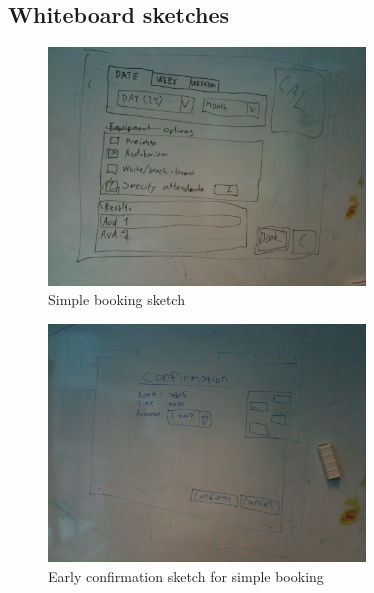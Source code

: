 \pagebreak

\subsection{Whiteboard sketches}

\begin{figure}
\begin{center}
\leavevmode
\includegraphics[width=0.75\textwidth]{images/whiteboard1}
\end{center}
\caption{Simple booking sketch}
\label{fig:app_w1}
\end{figure}

\begin{figure}
\begin{center}
\leavevmode
\includegraphics[width=0.75\textwidth]{images/whiteboard2}
\end{center}
\caption{Early confirmation sketch for simple booking}
\label{fig:app_w2}
\end{figure}

